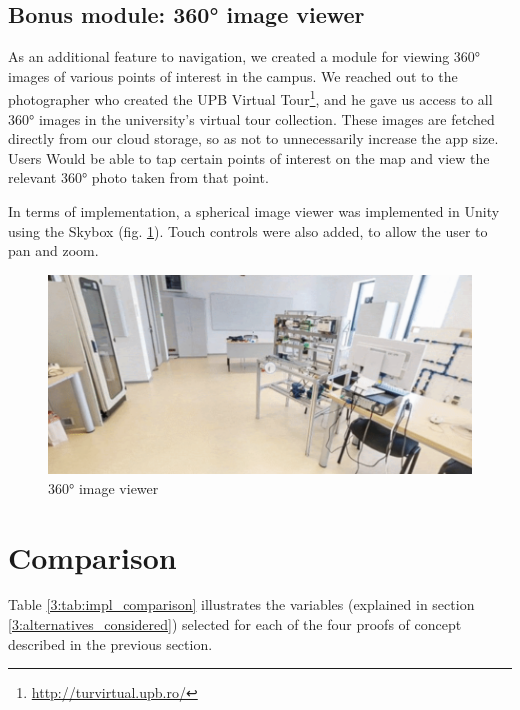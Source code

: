     \subsection{Bonus module: 360° image viewer} \label{3:360}
    
        As an additional feature to navigation, we created a module for viewing 360° images of various points of interest in the campus. We reached out to the photographer who created the UPB Virtual Tour\footnote{\url{http://turvirtual.upb.ro/}}, and he gave us access to all 360° images in the university's virtual tour collection. These images are fetched directly from our cloud storage, so as not to unnecessarily increase the app size. Users Would be able to tap certain points of interest on the map and view the relevant 360° photo taken from that point.
        
        In terms of implementation, a spherical image viewer was implemented in Unity using the Skybox (fig. \ref{3:fig:360_image_viewer}). Touch controls were also added, to allow the user to pan and zoom.
        
        \begin{figure}[ht]
            \centering
            \includegraphics[width=\textwidth]{figures/demos/360_image_viewer.png}
            \caption{360° image viewer}
            \label{3:fig:360_image_viewer}
        \end{figure}
    
\section{Comparison}

    Table \ref{3:tab:impl_comparison} illustrates the variables (explained in section \ref{3:alternatives_considered}) selected for each of the four proofs of concept described in the previous section.

